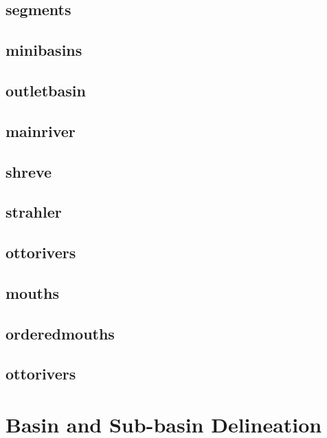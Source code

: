 \documentclass[
]{book}
\theoremstyle{definition}
\theoremstyle{definition}
\theoremstyle{definition}
\theoremstyle{definition}
\theoremstyle{remark}
\begin{document}
\subsection{segments}\label{segments}

\subsection{minibasins}\label{minibasins}

\subsection{outletbasin}\label{outletbasin}

\subsection{mainriver}\label{mainriver}

\subsection{shreve}\label{shreve}

\subsection{strahler}\label{strahler}

\subsection{ottorivers}\label{ottorivers}

\subsection{mouths}\label{mouths}

\subsection{orderedmouths}\label{orderedmouths}

\subsection{ottorivers}\label{ottorivers}

\section{Basin and Sub-basin Delineation}\label{Basin-and-Sub-basin-Delineation}
\end{document}
